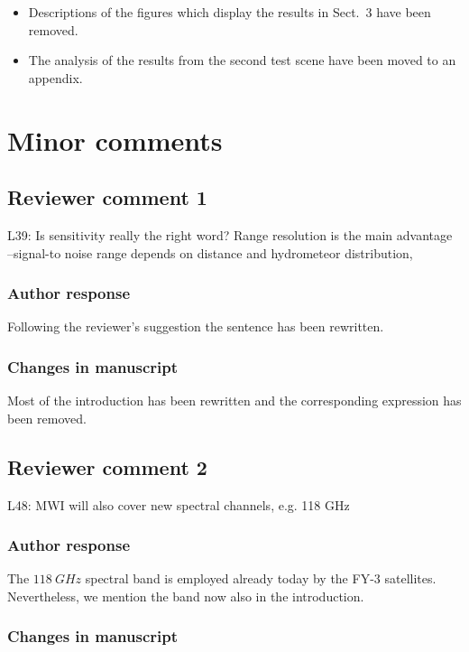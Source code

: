 \begin{itemize}
\item Descriptions of the figures which display the results in Sect.~3 have
  been removed.
\item The analysis of the results from the second test scene have been
  moved to an appendix.
\end{itemize}

\section{Minor comments}
\subsection*{Reviewer comment 1}

L39: Is sensitivity really the right word? Range resolution is the main
advantage –signal-to noise range depends on distance and hydrometeor
distribution,

\subsubsection*{Author response}

Following the reviewer's suggestion the sentence has been rewritten.

\subsubsection*{Changes in manuscript}

Most of the introduction has been rewritten and the corresponding
expression has been removed.

\subsection*{Reviewer comment 2}

L48: MWI will also cover new spectral channels, e.g. 118 GHz

\subsubsection*{Author response}

The $118\ \unit{GHz}$ spectral band is employed already today by the FY-3
satellites. Nevertheless, we mention the band now also in the introduction.

\subsubsection*{Changes in manuscript}

